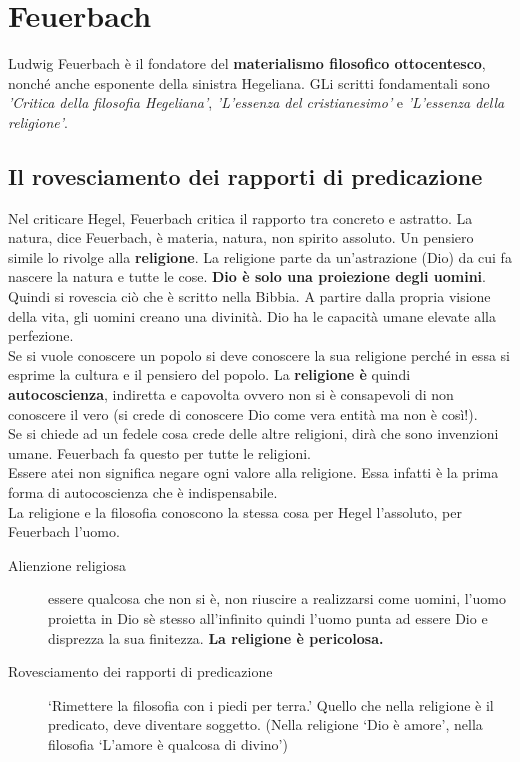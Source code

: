 
\section{Feuerbach}
Ludwig Feuerbach è il fondatore del \textbf{materialismo filosofico ottocentesco}, nonché anche
esponente della sinistra Hegeliana. GLi scritti fondamentali sono \textit{'Critica della filosofia
Hegeliana'}, \textit{'L'essenza del cristianesimo'} e  \textit{'L'essenza della religione'}.

\subsection{Il rovesciamento dei rapporti di predicazione}
Nel criticare Hegel, Feuerbach critica il rapporto tra concreto e astratto. La natura, dice 
Feuerbach, è materia, natura, non spirito assoluto. Un pensiero simile lo rivolge alla 
\textbf{religione}. La religione parte da un'astrazione (Dio) da cui fa nascere la natura e tutte le 
cose. \textbf{Dio è solo una proiezione degli uomini}. Quindi si rovescia ciò che è scritto nella 
Bibbia. A partire dalla propria visione della vita, gli uomini creano una divinità. Dio ha le
capacità umane elevate alla perfezione.\\
Se si vuole conoscere un popolo si deve conoscere la sua religione perché in essa si esprime la
cultura e il pensiero del popolo. La \textbf{religione è} quindi \textbf{autocoscienza}, indiretta
e capovolta ovvero non si è consapevoli di non conoscere il vero (si crede di conoscere Dio come
vera entità ma non è così!).\\
Se si chiede ad un fedele cosa crede delle altre religioni, dirà che sono invenzioni umane. Feuerbach
fa questo per tutte le religioni.\\
Essere atei non significa negare ogni valore alla religione. Essa infatti è la prima forma di
autocoscienza che è indispensabile.\\
La religione e la filosofia conoscono la stessa cosa per Hegel l'assoluto, per Feuerbach l'uomo.
\begin{description}
  \item[Alienzione religiosa] essere qualcosa che non si è, non riuscire a realizzarsi come uomini,
    l'uomo proietta in Dio sè stesso all'infinito quindi l'uomo punta ad essere Dio e disprezza la
    sua finitezza. \textbf{La religione è pericolosa.}
  \item[Rovesciamento dei rapporti di predicazione] `Rimettere la filosofia con i piedi per terra.'
    Quello che nella religione è il predicato, deve diventare soggetto. (Nella religione `Dio è 
    amore', nella filosofia `L'amore è qualcosa di divino')
\end{description}
